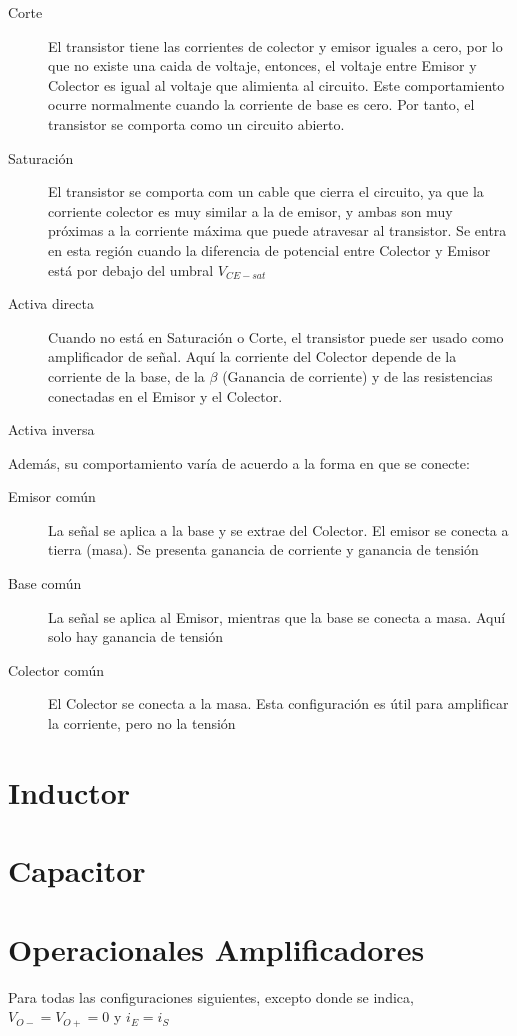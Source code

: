 \documentclass[12pt,spanish,lettersize]{report}
\begin{document}
\begin{description}
\item[Corte] El transistor tiene las corrientes de colector y emisor iguales a cero, por lo que no existe una caida de voltaje, entonces, el voltaje entre Emisor y Colector es igual al voltaje que alimienta al circuito. Este comportamiento ocurre normalmente cuando la corriente de base es cero. Por tanto, el transistor se comporta como un circuito abierto.
\item[Saturaci\'on] El transistor se comporta com un cable que cierra el circuito, ya que la corriente colector es muy similar a la de emisor, y ambas son muy pr\'oximas a la corriente m\'axima que puede atravesar al transistor. Se entra en esta regi\'on cuando la diferencia de potencial entre Colector y Emisor est\'a por debajo del umbral $V_{CE-sat}$
\item[Activa directa] Cuando no est\'a en Saturaci\'on o Corte, el transistor puede ser usado como amplificador de se\~nal. Aqu\'i la corriente del Colector depende de la corriente de la base, de la $\beta$ (Ganancia de corriente) y de las resistencias conectadas en el Emisor y el Colector.
\item[Activa inversa]
\end{description}
Adem\'as, su comportamiento var\'ia de acuerdo a la forma en que se conecte:
\begin{description}
\item[Emisor com\'un] La se\~nal se aplica a la base y se extrae del Colector. El emisor se conecta a tierra (masa). Se presenta ganancia de corriente y ganancia de tensi\'on
\item[Base com\'un]La se\~nal se aplica al Emisor, mientras que la base se conecta a masa. Aqu\'i solo hay ganancia de tensi\'on
\item[Colector com\'un]El Colector se conecta a la masa. Esta configuraci\'on es \'util para amplificar la corriente, pero no la tensi\'on
\end{description}
\section{Inductor}
\section{Capacitor}
\section{Operacionales Amplificadores}
Para todas las configuraciones siguientes, excepto donde se indica, $V_{O-}=V_{O+}=0$ y $i_E=i_S$
\end{document}
